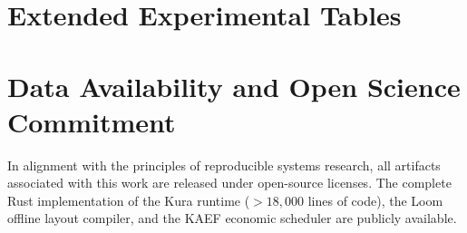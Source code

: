 \section{Extended Experimental Tables}
\label{sec:appendix_tables}

\begin{table}[H]
\caption{Comprehensive performance breakdown across the evaluated model configurations under tested host RAM limits. Throughput is measured in tokens/second; storage I/O stall time is cumulative per sequence.}
\label{tab:extended_ladder}
\centering
{}
\end{table}

\section{Data Availability and Open Science Commitment}
In alignment with the principles of reproducible systems research, all artifacts associated with this work are released under open-source licenses. The complete Rust implementation of the Kura runtime ($>18,000$ lines of code), the Loom offline layout compiler, and the KAEF economic scheduler are publicly available. 

